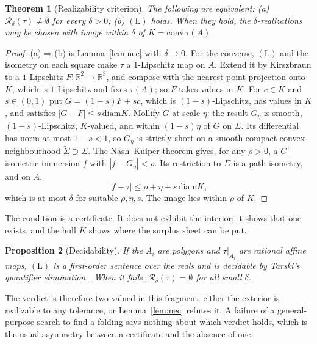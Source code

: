 \documentclass[11pt]{article}
\newtheorem{theorem}{Theorem}
\newtheorem{proposition}[theorem]{Proposition}
\theoremstyle{definition}
\theoremstyle{remark}
\begin{document}
\begin{theorem}[Realizability criterion]\label{thm:criterion}
The following are equivalent: (a) $\mathcal R_\delta(\tau)\ne\emptyset$ for every $\delta>0$; (b) $(\mathrm L)$ holds. When they hold, the $\delta$-realizations may be chosen with image within $\delta$ of $K=\mathrm{conv}\,\tau(A)$.
\end{theorem}

\begin{proof}
(a)$\Rightarrow$(b) is Lemma~\ref{lem:nec} with $\delta\to0$. For the converse, $(\mathrm L)$ and the isometry on each square make $\tau$ a $1$-Lipschitz map on $A$. Extend it by Kirszbraun to a $1$-Lipschitz $F:\mathbb R^2\to\mathbb R^3$, and compose with the nearest-point projection onto $K$, which is $1$-Lipschitz and fixes $\tau(A)$; so $F$ takes values in $K$. For $c\in K$ and $s\in(0,1)$ put $G=(1-s)F+sc$, which is $(1-s)$-Lipschitz, has values in $K$, and satisfies $|G-F|\le s\,\mathrm{diam}K$. Mollify $G$ at scale $\eta$: the result $G_\eta$ is smooth, $(1-s)$-Lipschitz, $K$-valued, and within $(1-s)\eta$ of $G$ on $\Sigma$. Its differential has norm at most $1-s<1$, so $G_\eta$ is strictly short on a smooth compact convex neighbourhood $\tilde\Sigma\supset\Sigma$. The Nash--Kuiper theorem gives, for any $\rho>0$, a $C^1$ isometric immersion $f$ with $|f-G_\eta|<\rho$. Its restriction to $\Sigma$ is a path isometry, and on $A$,
\[
|f-\tau|\le\rho+\eta+s\,\mathrm{diam}K,
\]
which is at most $\delta$ for suitable $\rho,\eta,s$. The image lies within $\rho$ of $K$.
\end{proof}

The condition is a certificate. It does not exhibit the interior; it shows that one exists, and the hull $K$ shows where the surplus sheet can be put.

\begin{proposition}[Decidability]\label{prop:decid}
If the $A_i$ are polygons and $\tau|_{A_i}$ are rational affine maps, $(\mathrm L)$ is a first-order sentence over the reals and is decidable by Tarski's quantifier elimination \cite{tarski1951}. When it fails, $\mathcal R_\delta(\tau)=\emptyset$ for all small $\delta$.
\end{proposition}

The verdict is therefore two-valued in this fragment: either the exterior is realizable to any tolerance, or Lemma~\ref{lem:nec} refutes it. A failure of a general-purpose search to find a folding says nothing about which verdict holds, which is the usual asymmetry between a certificate and the absence of one.
\end{document}
